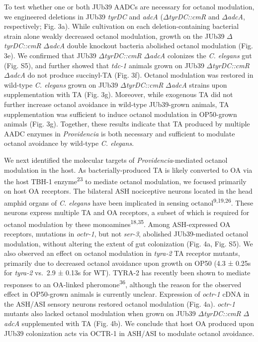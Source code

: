 \documentclass[11pt,]{article}
\begin{document}
To test whether one or both JUb39 AADCs are necessary for octanol
modulation, we engineered deletions in JUb39 \emph{tyrDC} and
\emph{adcA} (\emph{\(\Delta\)tyrDC::cmR} and \emph{\(\Delta\)adcA},
respectively; Fig. 3a). While cultivation on each deletion-containing
bacterial strain alone weakly decreased octanol modulation, growth on
the JUb39 \emph{\(\Delta\)tyrDC::cmR} \emph{\(\Delta\)adcA} double
knockout bacteria abolished octanol modulation (Fig. 3e). We confirmed
that JUb39 \emph{\(\Delta\)tyrDC::cmR} \emph{\(\Delta\)adcA} colonizes
the \emph{C. elegans} gut (Fig. S5), and further showed that
\emph{tdc-1} animals grown on JUb39 \emph{\(\Delta\)tyrDC::cmR}
\emph{\(\Delta\)adcA} do not produce succinyl-TA (Fig. 3f). Octanol
modulation was restored in wild-type \emph{C. elegans} grown on JUb39
\emph{\(\Delta\)tyrDC::cmR} \emph{\(\Delta\)adcA} strains upon
supplementation with TA (Fig. 3g). Moreover, while exogenous TA did not
further increase octanol avoidance in wild-type JUb39-grown animals, TA
supplementation was sufficient to induce octanol modulation in
OP50-grown animals (Fig. 3g). Together, these results indicate that TA
produced by multiple AADC enzymes in \emph{Providencia} is both
necessary and sufficient to modulate octanol avoidance by wild-type
\emph{C. elegans}.

We next identified the molecular targets of
\textit{Providencia}-mediated octanol modulation in the host. As
bacterially-produced TA is likely converted to OA via the host TBH-1
enzyme\textsuperscript{23} to mediate octanol modulation, we focused
primarily on host OA receptors. The bilateral ASH nociceptive neurons
located in the head amphid organs of \textit{C. elegans} have been
implicated in sensing octanol\textsuperscript{9,19,26}. These neurons
express multiple TA and OA receptors, a subset of which is required for
octanol modulation by these monoamines\textsuperscript{18,35}. Among
ASH-expressed OA receptors, mutations in \emph{octr-1}, but not
\emph{ser-3}, abolished JUb39-mediated octanol modulation, without
altering the extent of gut colonization (Fig. 4a, Fig. S5). We also
observed an effect on octanol modulation in \emph{tyra-2} TA receptor
mutants, primarily due to decreased octanol avoidance upon growth on
OP50 (4.3 ± 0.25s for \emph{tyra-2} vs.~2.9 ± 0.13s for WT). TYRA-2 has
recently been shown to mediate responses to an OA-linked
pheromone\textsuperscript{36}, although the reason for the observed
effect in OP50-grown animals is currently unclear. Expression of
\emph{octr-1} cDNA in the ASH/ASI sensory neurons restored octanol
modulation (Fig. 4a). \emph{octr-1} mutants also lacked octanol
modulation when grown on JUb39 \emph{\(\Delta\)tyrDC::cmR}
\(\Delta\)\textit{adcA} supplemented with TA (Fig. 4b). We conclude that
host OA produced upon JUb39 colonization acts via OCTR-1 in ASH/ASI to
modulate octanol avoidance.
\end{document}
